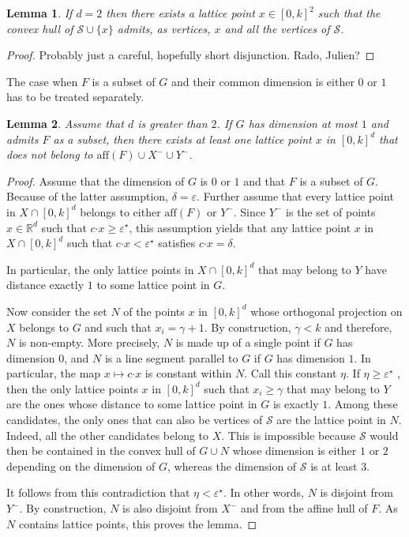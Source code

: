 \documentclass[a4paper]{article}
\newtheorem{lemma}{Lemma}[subsection]
\renewcommand{\S}{\mathcal{S}}
\begin{document}
\begin{lemma}\label{Lem.D}
If $d=2$ then there exists a lattice point $x\in[0,k]^2$ such that the convex hull of $\S\cup\{x\}$ admits, as vertices, $x$ and all the vertices of $\S$.
\end{lemma}
\begin{proof}
Probably just a careful, hopefully short disjunction. Rado, Julien?
\end{proof}

The case when $F$ is a subset of $G$ and their common dimension is either $0$ or $1$ has to be treated separately.

\begin{lemma}\label{Lem.E}
Assume that $d$ is greater than $2$. If $G$ has dimension at most $1$ and admits $F$ as a subset, then there exists at least one lattice point $x$ in $[0,k]^d$ that does not belong to $\mathrm{aff}(F)\cup{X^-}\cup{Y^-}$.
\end{lemma}
\begin{proof}
Assume that the dimension of $G$ is $0$ or $1$ and that $F$ is a subset of $G$. Because of the latter assumption, $\delta=\varepsilon$. Further assume that every lattice point in $X\cap[0,k]^d$ belongs to either $\mathrm{aff}(F)$ or $Y^-$. Since $Y^-$ is the set of points $x\in\mathbb{R}^d$ such that $c\mathord{\cdot}x\geq\varepsilon^\star$, this assumption yields that any lattice point $x$ in $X\cap[0,k]^d$
 such that $c\mathord{\cdot}x<\varepsilon^\star$ satisfies $c\mathord{\cdot}x=\delta$.

In particular, the only lattice points in $X\cap[0,k]^d$ that may belong to $Y$ have distance exactly $1$ to some lattice point in $G$.

Now consider the set $N$ of the points $x$ in $[0,k]^d$ whose orthogonal projection on $X$ belongs to $G$ and such that $x_i=\gamma+1$. By construction, $\gamma<k$ and therefore, $N$ is non-empty. More precisely, $N$ is made up of a single point if $G$ has dimension $0$, and $N$ is a line segment parallel to $G$ if $G$ has dimension $1$. In particular, the map $x\mapsto{c\mathord{\cdot}x}$ is constant within $N$. Call this constant $\eta$. If $\eta\geq\varepsilon^\star$
, then the only lattice points $x$ in $[0,k]^d$ such that $x_i\geq\gamma$ that may belong to $Y$ are the ones whose distance to some lattice point in $G$ is exactly $1$. Among these candidates, the only ones that can also be vertices of $\S$ are the lattice point in $N$. Indeed, all the other candidates belong to $X$. This is impossible because $\S$ would then be contained in the convex hull of $G\cup{N}$ whose dimension is either $1$ or $2$ depending on the dimension of $G$, whereas the dimension of $\S$ is at least $3$.

It follows from this contradiction that $\eta<\varepsilon^\star$. In other words, $N$ is disjoint from $Y^-$. By construction, $N$ is also disjoint from $X^-$ and from the affine hull of $F$. As $N$ contains lattice points, this proves the lemma.
\end{proof}
\end{document}
